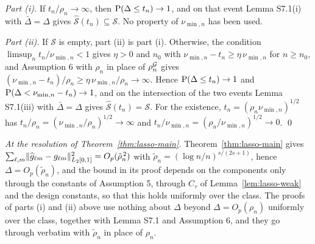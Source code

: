 \emph{Part (i).} If $t_n/\rho_n \to \infty$, then
$\mathrm{P}(\Delta \le t_n) \to 1$, and on that event Lemma S7.1(i) with
$\bar{\Delta} = \Delta$ gives $\widehat{\mathcal{S}}(t_n) \subseteq \mathcal{S}$. No property of $\nu_{\min,n}$
has been used.

\emph{Part (ii).} If $\mathcal{S}$ is empty, part (ii) is part (i). Otherwise, the
condition $\limsup_n t_n/\nu_{\min,n} < 1$ gives $\eta > 0$ and $n_0$ with
$\nu_{\min,n} - t_n \ge \eta\,\nu_{\min,n}$ for $n \ge n_0$, and Assumption 6 with $\rho_n$ in place of $\rho^{\mathcal{G}}_{n}$ gives
$(\nu_{\min,n} - t_n)/\rho_n \ge \eta\,\nu_{\min,n}/\rho_n \to \infty$. Hence
$\mathrm{P}(\Delta \le t_n) \to 1$ and $\mathrm{P}(\Delta < \nu_{\min,n} - t_n) \to 1$, and
on the intersection of the two events Lemma S7.1(iii) with $\bar{\Delta} = \Delta$ gives
$\widehat{\mathcal{S}}(t_n) = \mathcal{S}$. For the existence, $t_n = (\rho_n\nu_{\min,n})^{1/2}$ has
$t_n/\rho_n = (\nu_{\min,n}/\rho_n)^{1/2} \to \infty$ and
$t_n/\nu_{\min,n} = (\rho_n/\nu_{\min,n})^{1/2} \to 0$. \qed

\emph{At the resolution of Theorem~\ref{thm:lasso-main}.} Theorem~\ref{thm:lasso-main} gives
$\sum_{\ell,m}\lVert\widehat{g}_{\ell m}-g_{\ell m}\rVert^2_{L_2[0,1]}
= O_p(\tilde\rho_n^{\,2})$ with $\tilde\rho_n = (\log n/n)^{s/(2s+1)}$, hence
$\Delta = O_p(\tilde\rho_n)$, and the bound in its proof depends on the
components only through the constants of Assumption 5, through $C_\tau$ of
Lemma~\ref{lem:lasso-weak} and the design constants, so that this holds uniformly over the
class. The proofs of parts (i) and (ii) above use nothing about $\Delta$
beyond $\Delta = O_p(\rho_n)$ uniformly over the class, together with
Lemma S7.1 and Assumption 6, and they go through verbatim with
$\tilde\rho_n$ in place of $\rho_n$.



